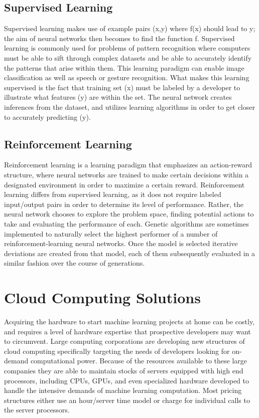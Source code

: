 \documentclass[onecolumn, draftclsnofoot,10pt, compsoc]{IEEEtran}
\begin{document}
    \subsection{Supervised Learning}
    Supervised learning makes use of example pairs (x,y) where f(x) should lead to y; the aim of neural networks then becomes to find the function f. Supervised learning is commonly used for problems of pattern recognition where computers must be able to sift through complex datasets and be able to accurately identify the patterns that arise within them. This learning paradigm can enable image classification as well as speech or gesture recognition. What makes this learning supervised is the fact that training set (x) must be labeled by a developer to illustrate what features (y) are within the set. The neural network creates inferences from the dataset, and utilizes learning algorithms in order to get closer to accurately predicting (y).
    \subsection{Reinforcement Learning}
    Reinforcement learning is a learning paradigm that emphasizes an action-reward structure, where neural networks are trained to make certain decisions within a designated environment in order to maximize a certain reward. Reinforcement learning differs from supervised learning, as it does not require labeled input/output pairs in order to determine its level of performance. Rather, the neural network chooses to explore the problem space, finding potential actions to take and evaluating the performance of each. Genetic algorithms are sometimes implemented to naturally select the highest performer of a number of reinforcement-learning neural networks. Once the model is selected iterative deviations are created from that model, each of them subsequently evaluated in a similar fashion over the course of generations.
    
    \section{Cloud Computing Solutions}
    Acquiring the hardware to start machine learning projects at home can be costly, and requires a level of hardware expertise that prospective developers may want to circumvent. Large computing corporations are developing new structures of cloud computing specifically targeting the needs of developers looking for on-demand computational power. Because of the resources available to these large companies they are able to maintain stocks of servers equipped with high end processors, including CPUs, GPUs, and even specialized hardware developed to handle the intensive demands of machine learning computation. Most pricing structures either use an hour/server time model or charge for individual calls to the server processors.
\end{document}
